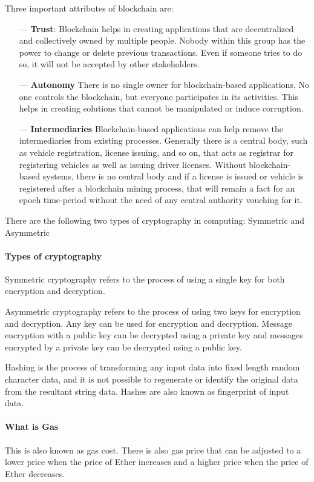 ﻿Three important attributes of blockchain are:

\begin{itemize}
\item[---] \textbf{Trust}: Blockchain helps in creating applications that are decentralized and collectively owned by multiple people. Nobody within this group has the power to change or delete previous transactions. Even if someone tries to do so, it will not be accepted by other stakeholders.
\item[---] \textbf{Autonomy} There is no single owner for blockchain-based applications. No one controls the blockchain, but everyone participates in its activities. This helps in creating solutions that cannot be manipulated or induce corruption.
\item[---] \textbf{Intermediaries} Blockchain-based applications can help remove the intermediaries from existing processes. Generally there is a central body, such as vehicle registration, license issuing, and so on, that acts as registrar for registering vehicles as well as issuing driver licenses. Without blockchain-based systems, there is no central body and if a license is issued or vehicle is registered after a blockchain mining process, that will remain a fact for an epoch time-period without the need of any central authority vouching for it.

\end{itemize}
There are the following two types of cryptography in computing: Symmetric and Asymmetric

\paragraph{Types of cryptography}
Symmetric cryptography refers to the process of using a single key for both encryption and decryption.

Asymmetric cryptography refers to the process of using two keys for encryption and decryption. Any key can be used for encryption and decryption. Message encryption with a public key can be decrypted using a private key and messages encrypted by a private key can be decrypted using a public key.


Hashing is the process of transforming any input data into fixed length random character data, and it is not possible to regenerate or identify the original data from the resultant string data. Hashes are also known as fingerprint of input data.

\paragraph{What is Gas}
This is also known as gas cost. There is also gas price that can be adjusted to a lower price when the price of Ether increases and a higher price when the price of Ether decreases. 


